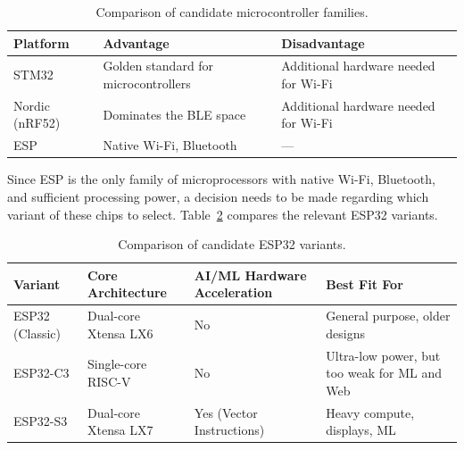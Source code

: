 \begin{table}[H]
    \caption{Comparison of candidate microcontroller families.}
    \footnotesize
    \centering
    \begin{tabular}{p{3cm}p{5.5cm}p{5.5cm}}
    \toprule
        \textbf{Platform} & \textbf{Advantage} & \textbf{Disadvantage} \\
    \midrule
        STM32 & Golden standard for microcontrollers & Additional hardware needed for Wi-Fi \\
        Nordic (nRF52) & Dominates the BLE space & Additional hardware needed for Wi-Fi \\
        ESP & Native Wi-Fi, Bluetooth & --- \\
    \bottomrule
    \end{tabular}
    \label{tab:mcu_family}
\end{table}

Since ESP is the only family of microprocessors with native Wi-Fi, Bluetooth, and sufficient processing power, a decision needs to be made regarding which variant of these chips to select. Table~\ref{tab:esp_variants} compares the relevant ESP32 variants.

\begin{table}[H]
    \caption{Comparison of candidate ESP32 variants.}
    \footnotesize
    \centering
    \begin{tabular}{p{3cm}p{3.5cm}p{3.5cm}p{3.5cm}}
    \toprule
        \textbf{Variant} & \textbf{Core Architecture} & \textbf{AI/ML Hardware Acceleration} & \textbf{Best Fit For} \\
    \midrule
        ESP32 (Classic) & Dual-core Xtensa LX6 & No & General purpose, older designs \\
        ESP32-C3 & Single-core RISC-V & No & Ultra-low power, but too weak for ML and Web \\
        ESP32-S3 & Dual-core Xtensa LX7 & Yes (Vector Instructions) & Heavy compute, displays, ML \\
    \bottomrule
    \end{tabular}
    \label{tab:esp_variants}
\end{table}